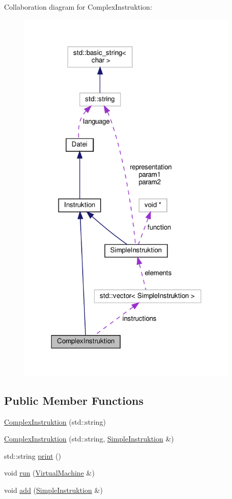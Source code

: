 Collaboration diagram for Complex\+Instruktion\+:
\nopagebreak
\begin{figure}[H]
\begin{center}
\leavevmode
\includegraphics[width=300pt]{class_complex_instruktion__coll__graph}
\end{center}
\end{figure}
\subsection*{Public Member Functions}
\begin{DoxyCompactItemize}
\item 
\mbox{\hyperlink{class_complex_instruktion_a954dad29a6453083400008671c0c05eb}{Complex\+Instruktion}} (std\+::string)
\item 
\mbox{\hyperlink{class_complex_instruktion_a781aafaec2554b759f887f2667272f06}{Complex\+Instruktion}} (std\+::string, \mbox{\hyperlink{class_simple_instruktion}{Simple\+Instruktion}} \&)
\item 
std\+::string \mbox{\hyperlink{class_complex_instruktion_a476d0f6ed0296cd4751543c4be6ca422}{print}} ()
\item 
void \mbox{\hyperlink{class_complex_instruktion_ab9e037eda3cf53252902f15541a01a21}{run}} (\mbox{\hyperlink{class_virtual_machine}{Virtual\+Machine}} \&)
\item 
void \mbox{\hyperlink{class_complex_instruktion_ae92fcdd92e0328d4eed826dea81b8c9c}{add}} (\mbox{\hyperlink{class_simple_instruktion}{Simple\+Instruktion}} \&)
\end{DoxyCompactItemize}
